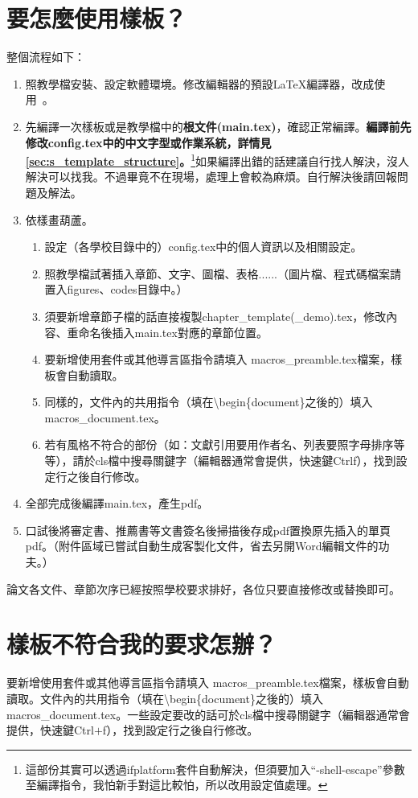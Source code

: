 \documentclass[class=NCU_thesis, crop=false, float=true]{standalone}
\begin{document}
\section{要怎麼使用樣板？}
整個流程如下：
\begin{enumerate}
    \item 照教學檔安裝、設定軟體環境。修改編輯器的預設LaTeX編譯器，{改成使用\XeLaTeX\ }。
    \item 先編譯一次樣板或是教學檔中的\textbf{根文件(main.tex)}，確認正常編譯。\textbf{編譯前先修改config.tex中的中文字型或作業系統，詳情見\cref{sec:s_template_structure}。}\footnote{這部份其實可以透過ifplatform套件自動解決，但須要加入``-shell-escape''參數至編譯指令，我怕新手對這比較怕，所以改用設定值處理。}如果編譯出錯的話建議自行找人解決，沒人解決可以找我。不過畢竟不在現場，處理上會較為麻煩。自行解決後請回報問題及解法。
    \item 依樣畫葫蘆。
    \begin{enumerate}
        \item 設定（各學校目錄中的）config.tex中的個人資訊以及相關設定。
        \item 照教學檔試著插入章節、文字、圖檔、表格......（圖片檔、程式碼檔案請置入figures、codes目錄中。）
        \item 須要新增章節子檔的話直接複製chapter\_template(\_demo).tex，修改內容、重命名後插入main.tex對應的章節位置。
        \item 要新增使用套件或其他導言區指令請填入 macros\_preamble.tex檔案，樣板會自動讀取。
        \item 同樣的，文件內的共用指令（填在\textbackslash{}begin\{document\}之後的）填入macros\_document.tex。
        \item 若有風格不符合的部份（如：文獻引用要用作者名、列表要照字母排序等等），請於cls檔中搜尋關鍵字（編輯器通常會提供，快速鍵Ctrl\+f），找到設定行之後自行修改。
    \end{enumerate}
    \item 全部完成後編譯main.tex，產生pdf。
    \item 口試後將審定書、推薦書等文書簽名後掃描後存成pdf置換原先插入的單頁pdf。（附件區域已嘗試自動生成客製化文件，省去另開Word編輯文件的功夫。）
\end{enumerate}
論文各文件、章節次序已經按照學校要求排好，各位只要直接修改或替換即可。

\section{樣板不符合我的要求怎辦？}
要新增使用套件或其他導言區指令請填入 macros\_preamble.tex檔案，樣板會自動讀取。文件內的共用指令（填在\textbackslash{}begin\{document\}之後的）填入macros\_document.tex。一些設定要改的話可於cls檔中搜尋關鍵字（編輯器通常會提供，快速鍵Ctrl$+$f），找到設定行之後自行修改。
        
\end{document}
